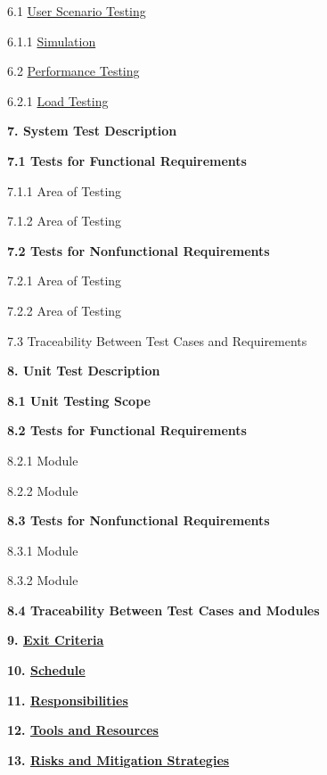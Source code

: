 \documentclass[
]{article}
\begin{document}
6.1
\href{https://chat.openai.com/c/ea27b6f7-2398-4e80-ab95-d57a6a8c356f\#41-user-scenario-testing}{User
Scenario Testing}

6.1.1
\href{https://chat.openai.com/c/ea27b6f7-2398-4e80-ab95-d57a6a8c356f\#411-simulation}{Simulation}

6.2
\href{https://chat.openai.com/c/ea27b6f7-2398-4e80-ab95-d57a6a8c356f\#42-performance-testing}{Performance
Testing}

6.2.1
\href{https://chat.openai.com/c/ea27b6f7-2398-4e80-ab95-d57a6a8c356f\#421-load-testing}{Load
Testing}

\textbf{7. System Test Description}

\textbf{7.1 Tests for Functional Requirements}

7.1.1 Area of Testing

7.1.2 Area of Testing

\textbf{7.2 Tests for Nonfunctional Requirements}

7.2.1 Area of Testing

7.2.2 Area of Testing

7.3 Traceability Between Test Cases and Requirements

\textbf{8. Unit Test Description}

\textbf{8.1 Unit Testing Scope}

\textbf{8.2 Tests for Functional Requirements}

8.2.1 Module

8.2.2 Module

\textbf{8.3 Tests for Nonfunctional Requirements}

8.3.1 Module

8.3.2 Module

\textbf{8.4 Traceability Between Test Cases and Modules}

\textbf{9.
\href{https://chat.openai.com/c/ea27b6f7-2398-4e80-ab95-d57a6a8c356f\#5-exit-criteria}{Exit
Criteria}}

\textbf{10.
\href{https://chat.openai.com/c/ea27b6f7-2398-4e80-ab95-d57a6a8c356f\#6-schedule}{Schedule}}

\textbf{11.
\href{https://chat.openai.com/c/ea27b6f7-2398-4e80-ab95-d57a6a8c356f\#7-responsibilities}{Responsibilities}}

\textbf{12.
\href{https://chat.openai.com/c/ea27b6f7-2398-4e80-ab95-d57a6a8c356f\#8-tools-and-resources}{Tools
and Resources}}

\textbf{13.
\href{https://chat.openai.com/c/ea27b6f7-2398-4e80-ab95-d57a6a8c356f\#9-risks-and-mitigation-strategies}{Risks
and Mitigation Strategies}}
\end{document}

